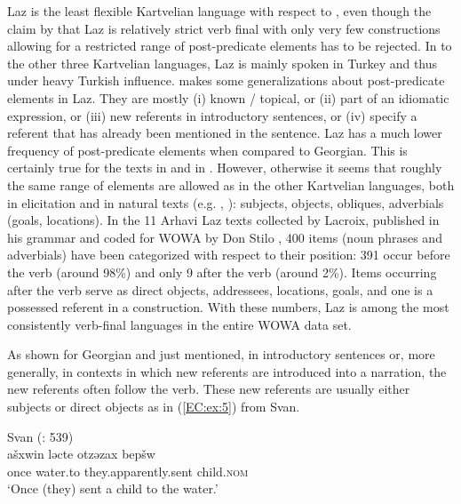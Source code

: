 \documentclass[output=paper,colorlinks,citecolor=brown,draftmode]{langscibook}
\begin{document}
Laz is the least flexible Kartvelian language with respect to , even though the claim by \citet[518]{testelets_kartvelian_2021,testelets_kartvelian_2021} that Laz is relatively strict verb final with only very few constructions allowing for a restricted range of post-predicate elements has to be rejected. In  to the other three Kartvelian languages, Laz is mainly spoken in Turkey and thus under heavy Turkish influence. \citet[737]{lacroix_description_2009} makes some generalizations about post-predicate elements in Laz. They are mostly (i) known / topical, or (ii) part of an idiomatic expression, or (iii) new referents in introductory sentences, or (iv) specify a referent that has already been mentioned in the sentence. Laz has a much lower frequency of post-predicate elements when compared to Georgian. This is certainly true for the texts in \citet{kutscher_ardesen_1998} and in \citet{stilo_laz_2021}. However, otherwise it seems that roughly the same range of elements are allowed as in the other Kartvelian languages, both in elicitation and in natural texts (e.g. \citealt{kutscher_ardesen_1998}, \citealt{lacroix_description_2009}): subjects, objects, obliques, adverbials (goals, locations). In the 11 Arhavi Laz texts collected by Lacroix, published in his grammar \citep{lacroix_description_2009} and coded for WOWA by Don Stilo \citep{stilo_laz_2021}, 400 items (noun phrases and adverbials) have been categorized with respect to their position: 391 occur before the verb (around 98\%) and only 9 after the verb (around 2\%). Items occurring after the verb serve as direct objects, addressees, locations, goals, and one is a possessed referent in a  construction. With these numbers, Laz is among the most consistently verb-final languages in the entire WOWA data set.

As shown for Georgian and just mentioned, in introductory sentences or, more generally, in contexts in which new referents are introduced into a narration, the new referents often follow the verb. These new referents are usually either subjects or direct objects as in (\ref{EC:ex:5}) from Svan.

\ea\label{EC:ex:5}
Svan (\citealt{schmidt_svan_1991}: 539) \\
\gll ašxwin ləcte otzəzax bepšw \\
once water.to they.apparently.sent child\textsc{.nom} \\
\glt `Once (they) sent a child to the water.'
\z
\end{document}
